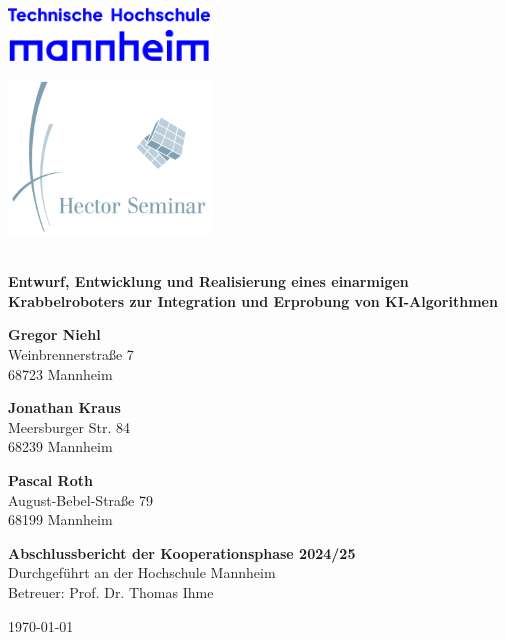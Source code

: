 \documentclass[12pt,a4paper]{article}
\begin{document}
	
	\begin{titlepage}
		\begin{minipage}[c]{0.49\textwidth}
			\raggedright
			\includegraphics[width=0.4\textwidth]{TH_Mannheim_Logo_RGB_blau.png}
		\end{minipage}
		\hfill
		\begin{minipage}[c]{0.49\textwidth}
			\raggedleft
			\includegraphics[width=0.4\textwidth]{logo.png}
		\end{minipage}
		\\[1cm]
		\centering
		\textbf{\LARGE{Entwurf, Entwicklung und Realisierung eines einarmigen Krabbelroboters zur Integration und Erprobung von KI-Algorithmen}} \\[2cm]
		
		\vfill
			\begin{minipage}[t]{0.32\textwidth}
			    \raggedright
			    \textbf{Gregor Niehl} \\
			    Weinbrennerstraße 7 \\
			    68723 Mannheim \\
			\end{minipage}
			\hfill
			\begin{minipage}[t]{0.32\textwidth}
			    \centering
			    \textbf{Jonathan Kraus} \\
			    Meersburger Str. 84 \\
			    68239 Mannheim \\
			\end{minipage}
			\hfill
			\begin{minipage}[t]{0.32\textwidth}
			    \raggedleft
			    \textbf{Pascal Roth} \\
			    August-Bebel-Straße 79\\
			    68199 Mannheim \\
			\end{minipage}
		\vfill
		
		\textbf{Abschlussbericht der Kooperationsphase 2024/25} \\
		Durchgeführt an der Hochschule Mannheim \\
		Betreuer: Prof. Dr. Thomas Ihme \\
		\vfill
		
		\today
	\end{titlepage}
	
	\tableofcontents
	\newpage
	
	
	
	
	
	
	
\end{document}
